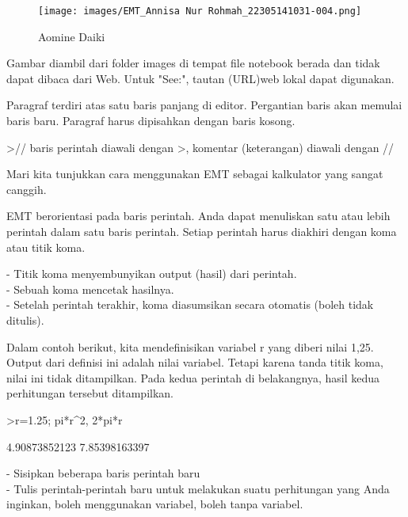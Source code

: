 \documentclass[a4paper,10pt]{article}
\begin{document}
\begin{eulernotebook}
\begin{eulercomment}
\end{eulercomment}
\begin{figure}[h]
    \centering
    \texttt{[image: images/EMT\_Annisa Nur Rohmah\_22305141031-004.png]}
    \caption{Aomine Daiki}
\end{figure}
\begin{eulercomment}

\end{eulercomment}
\eulersubheading{}
\begin{eulercomment}
Gambar diambil dari folder images di tempat file notebook berada dan
tidak dapat dibaca dari Web. Untuk "See:", tautan (URL)web lokal dapat
digunakan.

Paragraf terdiri atas satu baris panjang di editor. Pergantian baris
akan memulai baris baru. Paragraf harus dipisahkan dengan baris
kosong.
\end{eulercomment}
\begin{eulerprompt}
>// baris perintah diawali dengan >, komentar (keterangan) diawali dengan //
\end{eulerprompt}
\begin{eulercomment}
Mari kita tunjukkan cara menggunakan EMT sebagai kalkulator yang
sangat canggih.

EMT berorientasi pada baris perintah. Anda dapat menuliskan satu atau
lebih perintah dalam satu baris perintah. Setiap perintah harus
diakhiri dengan koma atau titik koma.

- Titik koma menyembunyikan output (hasil) dari perintah.\\
- Sebuah koma mencetak hasilnya.\\
- Setelah perintah terakhir, koma diasumsikan secara otomatis (boleh
tidak ditulis).

Dalam contoh berikut, kita mendefinisikan variabel r yang diberi nilai
1,25. Output dari definisi ini adalah nilai variabel. Tetapi karena
tanda titik koma, nilai ini tidak ditampilkan. Pada kedua perintah di
belakangnya, hasil kedua perhitungan tersebut ditampilkan.
\end{eulercomment}
\begin{eulerprompt}
>r=1.25; pi*r^2, 2*pi*r
\end{eulerprompt}
\begin{euleroutput}
  4.90873852123
  7.85398163397
\end{euleroutput}
\begin{eulercomment}
- Sisipkan beberapa baris perintah baru\\
- Tulis perintah-perintah baru untuk melakukan suatu perhitungan yang
Anda inginkan, boleh menggunakan variabel, boleh tanpa variabel.


\end{eulercomment}
\end{eulernotebook}
\end{document}
